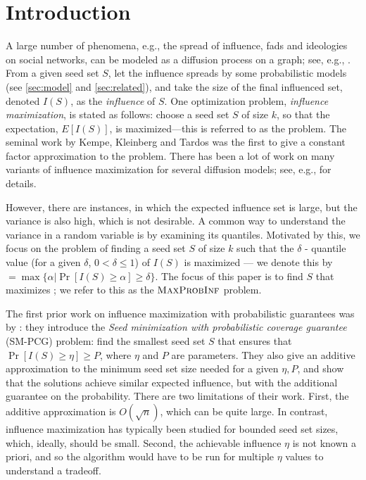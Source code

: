 \vspace{-0.2in}
\section{Introduction}
\label{sec:intro}

A large number of phenomena, e.g., the spread of influence, fads and ideologies on social
networks, can be modeled as a diffusion process on a graph; see, e.g., \cite{ek-2010,v011a004}.
From a given seed set $S$, let the influence spreads by some probabilistic models
(see \ref{sec:model} and \ref{sec:related}), and take the size of the final influenced
set, denoted $I(S)$, as the \textit{influence} of $S$. One optimization problem, \textit{influence
maximization}, is stated as follows: choose a seed set $S$ of size $k$, so
that the expectation, $E[I(S)]$, is maximized---this is referred to as the
 \infmax{} problem.
The seminal work by Kempe, Kleinberg and Tardos \cite{kkt-2003} was the first to give a constant
factor approximation to the \infmax{} problem.
There has been a lot of work on many variants of influence maximization for several diffusion
models; see, e.g., \cite{v011a004,ek-2010} for details.

However, there are instances, in which the expected influence set is large, but
the variance is also high, which is not desirable.
A common way to understand the variance in a random variable is by examining its quantiles.
Motivated by this, we focus on the problem of finding a seed set $S$ of size $k$ such that the
$\delta$ - quantile value (for a given $\delta$, $0 < \delta \leq 1$) of $I(S)$ is maximized ---
we denote this by \maxinfdelta $= \max\{\alpha| \Pr[I(S)\geq\alpha] \geq\delta\}$. The focus
of this paper is to find $S$ that maximizes \maxinfdelta; we refer to this as the $\textsc{MaxProbInf}{}$
problem.

The first prior work on influence maximization with probabilistic guarantees was by
\cite{zhang:kdd14}: they introduce the \emph{Seed minimization with probabilistic coverage guarantee} (SM-PCG) problem: find the smallest seed set $S$ that ensures that $\Pr[I(S)\geq\eta]\geq P$, where $\eta$ and $P$ are parameters. They also give an additive approximation to the minimum seed set size needed for a given $\eta, P$, and show that the solutions achieve similar expected influence, but with the additional guarantee on the probability.
There are two limitations of their work. First, the additive approximation is $O(\sqrt{n})$,
which can be quite large. In contrast, influence maximization has typically been studied for
bounded seed set sizes, which, ideally, should be small. Second, the achievable influence $\eta$
is not known a priori, and so the algorithm would have to be run for multiple $\eta$ values to
understand a tradeoff.

